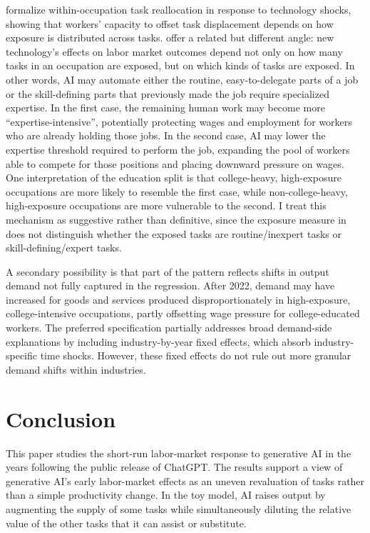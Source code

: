\documentclass[11pt]{article}
\theoremstyle{plain}
\theoremstyle{remark}
\begin{document}
\textcite{hampole2025ai} formalize within-occupation task reallocation in response to technology shocks, showing that workers’ capacity to offset task displacement depends on how exposure is distributed across tasks. \textcite{autor2025expertise} offer a related but different angle: new technology’s effects on labor market outcomes depend not only on how many tasks in an occupation are exposed, but on which kinds of tasks are exposed. In other words, AI may automate either the routine, easy-to-delegate parts of a job or the skill-defining parts that previously made the job require specialized expertise. In the first case, the remaining human work may become more ``expertise-intensive'', potentially protecting wages and employment for workers who are already holding those jobs. In the second case, AI may lower the expertise threshold required to perform the job, expanding the pool of workers able to compete for those positions and placing downward pressure on wages. One interpretation of the education split is that college-heavy, high-exposure occupations are more likely to resemble the first case, while non-college-heavy, high-exposure occupations are more vulnerable to the second. I treat this mechanism as suggestive rather than definitive, since the  exposure measure in \textcite{eloundou2024gpts} does not distinguish whether the exposed tasks are routine/inexpert tasks or skill-defining/expert tasks.

A secondary possibility is that part of the pattern reflects shifts in output demand not fully captured in the regression. After 2022, demand may have increased for goods and services produced disproportionately in high-exposure, college-intensive occupations, partly offsetting wage pressure for college-educated workers. The preferred specification partially addresses broad demand-side explanations by including industry-by-year fixed effects, which absorb industry-specific time shocks. However, these fixed effects do not rule out more granular demand shifts within industries.





\section{Conclusion}
\label{sec:conclusion}
This paper studies the short-run labor-market response to generative AI in the years following the public release of ChatGPT. The results support a view of generative AI’s early labor-market effects as an uneven revaluation of tasks rather than a simple productivity change. In the toy model, AI raises output by augmenting the supply of some tasks while simultaneously diluting the relative value of the other tasks that it can assist or substitute. 
\end{document}
